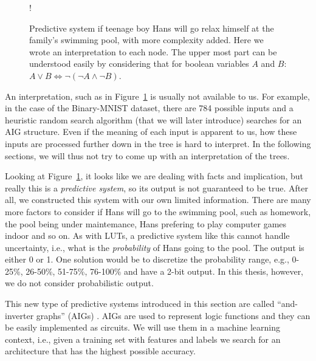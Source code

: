 \begin{figure}[!htb]
    \centering
    \resizebox {0.65\textwidth} {!} {
      
    }
    \caption{Predictive system if teenage boy Hans will go relax himself at the family's swimming pool, with more complexity added. Here we wrote an interpretation to each node. The upper most part can be understood easily by considering that for boolean variables $A$ and $B$: $A \vee B \Leftrightarrow \lnot (\lnot A \wedge \lnot B)$.}
\label{fig:aig3}
\end{figure}
\FloatBarrier

An interpretation, such as in Figure~\ref{fig:aig3} is usually not available to us. For example, in the case of the Binary-MNIST dataset, there are 784 possible inputs and a heuristic random search algorithm (that we will later introduce) searches for an AIG structure. Even if the meaning of each input is apparent to us, how these inputs are processed further down in the tree is hard to interpret. In the following sections, we will thus not try to come up with an interpretation of the trees.

Looking at Figure~\ref{fig:aig3}, it looks like we are dealing with facts and implication, but really this is a \textit{predictive system}, so its output is not guaranteed to be true. After all, we constructed this system with our own limited information. There are many more factors to consider if Hans will go to the swimming pool, such as homework, the pool being under maintemance, Hans prefering to play computer games indoor and so on. As with LUTs, a predictive system like this cannot handle uncertainty, i.e., what is the \textit{probability} of Hans going to the pool. The output is either 0 or 1. One solution would be to discretize the probability range, e.g., 0-25\%, 26-50\%, 51-75\%, 76-100\% and have a 2-bit output. In this thesis, however, we do not consider probabilistic output.

This new type of predictive systems introduced in this section are called \enquote{and-inverter graphs} (AIGs) \cite{bib:aig_wiki}. AIGs are used to represent logic functions and they can be easily implemented as circuits. We will use them in a machine learning context, i.e., given a training set with features and labels we search for an architecture that has the highest possible accuracy.

